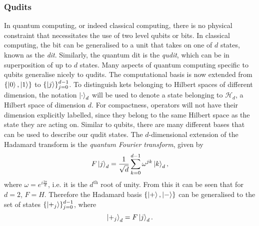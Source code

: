 \subsubsection{Qudits}
\label{subsubsection:qudits}
In quantum computing, or indeed classical computing, there is no physical constraint that necessitates the use of two level qubits or bits.
In classical computing, the bit can be generalised to a unit that takes on one of $d$ states, known as the \emph{dit}.
Similarly, the quantum dit is the \emph{qudit}, which can be in superposition of up to $d$ states.
Many aspects of quantum computing specific to qubits generalise nicely to qudits.
The computational basis is now extended from $\{\ket{0}, \ket{1}\}$ to $\{\ket{j}\}_{j=0}^{d-1}$.
To distinguish kets belonging to Hilbert spaces of different dimension, the notation $\ket{\cdot}_d$ will be used to denote a state belonging to $\mathcal{H}_d$, a Hilbert space of dimension $d$.
For compactness, operators will not have their dimension explicitly labelled, since they belong to the same Hilbert space as the state they are acting on.
Similar to qubits, there are many different bases that can be used to describe our qudit states.
The $d$-dimensional extension of the Hadamard transform is the \emph{quantum Fourier transform}, given by
\begin{equation}
    F\ket{j}_d = \frac{1}{\sqrt{d}} \sum_{k=0}^{d-1} \omega^{jk}\ket{k}_d,
\end{equation}
where $\omega = e^{i\frac{2\pi}{d}}$, i.e. it is the $d^{\text{th}}$ root of unity.
From this it can be seen that for $d = 2$, $F = H$.
Therefore the Hadamard basis $\{\ket{+}, \ket{-}\}$ can be generalised to the set of states  $\{\ket{+_j}\}_{j=0}^{d-1}$, where
\begin{equation}
    \ket{+_j}_d = F\ket{j}_d.
\end{equation}

